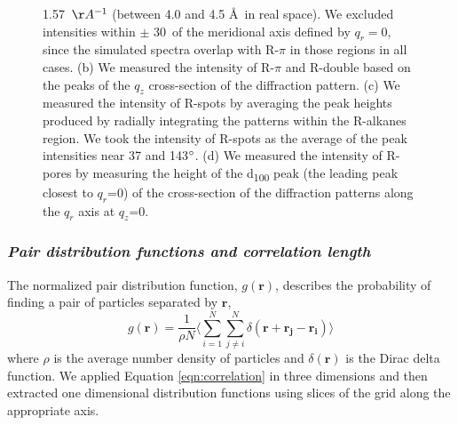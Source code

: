 \documentclass[journal=jpcbfk,manuscript=article]{achemso}
\begin{document}
\begin{figure}[!htb]
{  1.57~$\AA^{-1}$ (between 4.0 and 4.5 \AA~in real space). We excluded intensities
  within $\pm$ 30\degree~of the meridional axis defined by $q_r=0$, since the 
  simulated spectra overlap with R-$\pi$ in those regions in all cases. (b) We
  measured the intensity of R-$\pi$ and R-double based on the peaks of the $q_z$
  cross-section of the diffraction pattern. (c) We measured the intensity of R-spots
  by averaging the peak heights produced by radially integrating the patterns within 
  the R-alkanes region. We took the intensity of R-spots as the average of the 
  peak intensities near 37 and 143$\degree$. (d) We measured the intensity of 
  R-pores by measuring the height of the d\textsubscript{100} peak (the leading
  peak closest to $q_r$=0) of the cross-section of the diffraction patterns along
  the $q_r$ axis at $q_z$=0.} \label{fig:xrd_intensities}
  \end{figure}
 
  \subsubsection{\textit{Pair distribution functions and correlation length}}\label{section:correlation_length}

  The normalized pair distribution function, $g(\mathbf{r})$, describes
  the probability of finding a pair of particles separated by $\mathbf{r}$,
  \begin{equation}
	g(\mathbf{r})= \frac{1}{\rho N} \Bigg \langle \sum_{i=1}^{N}\sum_{j\neq i}^{N} \delta(\mathbf{r}+\mathbf{r_j}-\mathbf{r_i}) \Bigg \rangle
	\label{eqn:correlation}
  \end{equation}
  where $\rho$ is the average number density of particles and
  $\delta(\mathbf{r})$ is the Dirac delta function\cite{kuriabova_linear_2010}.
  We applied Equation \ref{eqn:correlation} in three dimensions and then
  extracted one dimensional distribution functions using slices of the grid
  along the appropriate axis.
\end{document}

